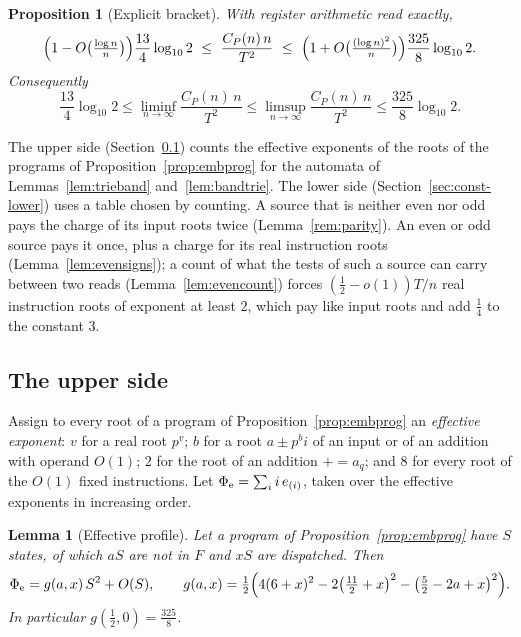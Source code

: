 \documentclass[11pt]{article}
\newtheorem{lemma}[theorem]{Lemma}
\newtheorem{proposition}[theorem]{Proposition}
\theoremstyle{remark}
\begin{document}
\begin{proposition}[Explicit bracket]\label{prop:bracket}
With register arithmetic read exactly,
\begin{equation}\label{eq:bracket-n}
  \Bigl(1-O\bigl(\tfrac{\log n}n\bigr)\Bigr)\frac{13}4\log_{10}2
  \ \le\ \frac{C_P(n)\,n}{T^2}\ \le\
  \Bigl(1+O\bigl(\tfrac{(\log n)^2}n\bigr)\Bigr)\frac{325}8\log_{10}2 .
\end{equation}
Consequently
\[
  \frac{13}4\log_{10}2\le\liminf_{n\to\infty}\frac{C_P(n)\,n}{T^2}
  \le\limsup_{n\to\infty}\frac{C_P(n)\,n}{T^2}\le\frac{325}8\log_{10}2 .
\]
\end{proposition}

The upper side (Section~\ref{sec:const-upper}) counts the effective exponents of the
roots of the programs of Proposition~\ref{prop:embprog} for the automata of
Lemmas~\ref{lem:trieband} and~\ref{lem:bandtrie}.  The lower side
(Section~\ref{sec:const-lower}) uses a table chosen by counting.  A source that is
neither even nor odd pays the charge of its input roots twice
(Lemma~\ref{rem:parity}).  An even or odd source pays it once, plus a charge for its real
instruction roots (Lemma~\ref{lem:evensigns}); a count of what the tests of such a source
can carry between two reads (Lemma~\ref{lem:evencount}) forces $(\frac12-o(1))T/n$ real
instruction roots of exponent at least $2$, which pay like input roots and add
$\frac14$ to the constant $3$.

\subsection{The upper side}\label{sec:const-upper}

Assign to every root of a program of Proposition~\ref{prop:embprog} an \emph{effective
exponent}: $v$ for a real root $p^v$; $b$ for a root $a\pm p^bi$ of an input or of an
addition with operand $O(1)$; $2$ for the root of an addition $\mathord{+}\!=a_q$; and $8$
for every root of the $O(1)$ fixed instructions.  Let $\Phi_{\rm e}=\sum_ii\,e_{(i)}$,
taken over the effective exponents in increasing order.

\begin{lemma}[Effective profile]\label{lem:effprofile}
Let a program of Proposition~\ref{prop:embprog} have $S$ states, of which $aS$ are not
in $F$ and $xS$ are dispatched.  Then
\[
  \Phi_{\rm e}=g(a,x)\,S^2+O(S),\qquad
  g(a,x)=\tfrac12\Bigl(4(6+x)^2-2\bigl(\tfrac{11}2+x\bigr)^2-\bigl(\tfrac52-2a+x\bigr)^2\Bigr).
\]
In particular $g(\frac12,0)=\frac{325}8$.
\end{lemma}
\end{document}
